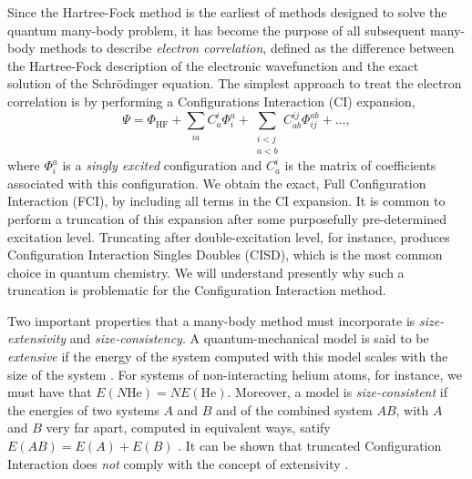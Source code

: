     Since the Hartree-Fock method is the earliest of methods designed to solve the quantum 
    many-body problem, it has become the purpose of all subsequent many-body methods to describe 
    \emph{electron correlation}, defined as the difference between the 
    Hartree-Fock description of the electronic wavefunction and the exact solution of 
    the Schrödinger equation. The simplest approach to treat the electron correlation
    is by performing a Configurations Interaction (CI) expansion,
    \begin{equation}
        \Psi = \Phi_\text{HF} 
            + \sum_{ia} C^i_a\Phi^a_i 
            + \sum_{\substack{i < j \\ a < b}} C^{ij}_{ab} \Phi^{ab}_{ij} + \dots,
    \end{equation}
    where $\Phi^a_i$ is a \emph{singly excited} configuration and $C^i_a$ is the matrix of 
    coefficients associated with this configuration. We obtain the exact,
    Full Configuration Interaction (FCI), by including all terms in the CI expansion.
    It is common to perform a truncation of this expansion after some purposefully 
    pre-determined excitation level. Truncating after 
    double-excitation level, for instance, produces Configuration Interaction Singles Doubles (CISD), 
    which is the most common choice in quantum chemistry.
    We will understand presently why such a truncation is problematic for the Configuration
    Interaction method.

    Two important properties that a many-body method must incorporate is \emph{size-extensivity}
    and \emph{size-consistency}. A quantum-mechanical model is said to be \emph{extensive}
    if the energy of the system computed with this model scales with the size of the 
    system \cite{bartlett1978many}. For systems of non-interacting helium atoms, for instance,
    we must have that $E(N\text{He}) = NE(\text{He})$. Moreover, a model is \emph{size-consistent}
    if the energies of two systems $A$ and $B$ and of the combined system $AB$, with 
    $A$ and $B$ very far apart, computed in equivalent ways, satify
    $E(AB) = E(A) + E(B)$ \cite{pople1976theoretical}. It can be shown that 
    truncated Configuration Interaction does \emph{not} comply with the concept of
    extensivity \cite{shavitt2009many}.

